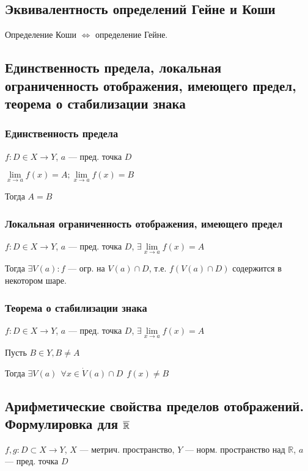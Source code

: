 \subsection{Эквивалентность определений Гейне и Коши}

Определение Коши $\Leftrightarrow$ определение Гейне.

\subsection{Единственность предела, локальная ограниченность отображения, имеющего предел, теорема о стабилизации знака}

\subsubsection{Единственность предела}

$f: D\in X\to Y$, $a$ --- пред. точка $D$

$\lim\limits_{x\to a} f(x)=A; \lim\limits_{x\to a} f(x)=B$

Тогда $A=B$

\subsubsection{Локальная ограниченность отображения, имеющего предел}

$f: D\in X\to Y$, $a$ --- пред. точка $D$, $\exists\lim\limits_{x\to a} f(x)=A$

Тогда $\exists V(a) : f$ --- огр. на $V(a)\cap D$, т.е. $f(V(a)\cap D)$ содержится в некотором шаре.

\subsubsection{Теорема о стабилизации знака}

$f: D\in X\to Y$, $a$ --- пред. точка $D$, $\exists\lim\limits_{x\to a} f(x)=A$

Пусть $B\in Y, B\not=A$

Тогда $\exists V(a) \ \ \forall x \in \dot V(a)\cap D \ \ f(x)\not = B$

\subsection{Арифметические свойства пределов отображений. Формулировка для $\overline{\operatorname*{\mathbb{R}}}$}

$f,g: D\subset X\to Y$, $X$ --- метрич. пространство, $Y$ --- норм. пространство над $\mathbb{R}$, $a$ --- пред. точка $D$


